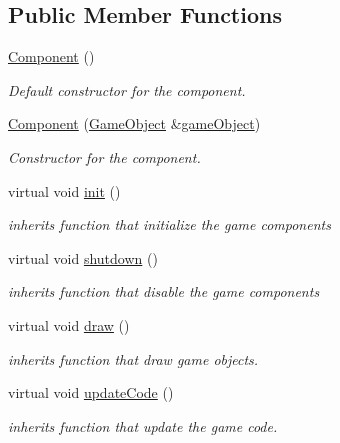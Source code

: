 \subsection*{Public Member Functions}
\begin{DoxyCompactItemize}
\item 
\hyperlink{classengine_1_1_component_a8775db6d1a2c1afc2e77cd3c8f39da6f}{Component} ()
\begin{DoxyCompactList}\small\item\em Default constructor for the component. \end{DoxyCompactList}\item 
\hyperlink{classengine_1_1_component_aa724dee82c2f103886b0663e8fd085a0}{Component} (\hyperlink{classengine_1_1_game_object}{Game\+Object} \&\hyperlink{classengine_1_1_component_ad4a4865ca4df98ebea34d04a4ec5ad07}{game\+Object})
\begin{DoxyCompactList}\small\item\em Constructor for the component. \end{DoxyCompactList}\item 
virtual void \hyperlink{classengine_1_1_component_aa0bf4fb5f4bc0de25d3f7beef3a3ca45}{init} ()
\begin{DoxyCompactList}\small\item\em inherits function that initialize the game components \end{DoxyCompactList}\item 
virtual void \hyperlink{classengine_1_1_component_a3e47775d51e78914bdfebba123354849}{shutdown} ()
\begin{DoxyCompactList}\small\item\em inherits function that disable the game components \end{DoxyCompactList}\item 
virtual void \hyperlink{classengine_1_1_component_a3d20060d4af0bf0dd0c833994581bdfa}{draw} ()
\begin{DoxyCompactList}\small\item\em inherits function that draw game objects. \end{DoxyCompactList}\item 
virtual void \hyperlink{classengine_1_1_component_a21fd10ef0e28e9c930ccbffa943486aa}{update\+Code} ()
\begin{DoxyCompactList}\small\item\em inherits function that update the game code. \end{DoxyCompactList}\item 

\end{DoxyCompactItemize}
